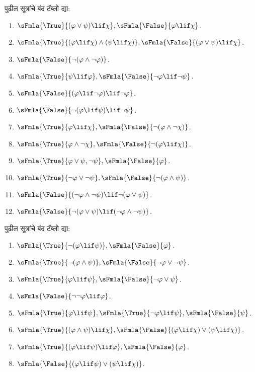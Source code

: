 \begin{prob}
पुढील सूत्रांचे बंद टॅब्लो द्या:
\begin{enumerate}
\item $\sFmla{\True}{(\varphi \lor \psi) \lif \chi}, \sFmla{\False}{\varphi \lif \chi}$.
\item $\sFmla{\True}{(\varphi \lif \chi) \land (\psi \lif \chi)}, \sFmla{\False}{(\varphi \lor \psi) \lif \chi}$.
\item $\sFmla{\False}{\lnot(\varphi \land \lnot \varphi)}$.
\item $\sFmla{\True}{\psi \lif \varphi}, \sFmla{\False}{\lnot \varphi \lif \lnot \psi}$.
\item $\sFmla{\False}{(\varphi \lif \lnot \varphi) \lif \lnot \varphi}$.
\item $\sFmla{\False}{\lnot(\varphi \lif \psi) \lif \lnot \psi}$.
\item $\sFmla{\True}{\varphi \lif \chi}, \sFmla{\False}{\lnot (\varphi \land \lnot \chi)}$.
\item $\sFmla{\True}{\varphi \land \lnot \chi}, \sFmla{\False}{\lnot (\varphi \lif \chi)}$.
\item $\sFmla{\True}{\varphi \lor \psi, \lnot \psi}, \sFmla{\False}{\varphi}$.
\item $\sFmla{\True}{\lnot \varphi \lor \lnot \psi}, \sFmla{\False}{\lnot(\varphi \land \psi)}$.
\item $\sFmla{\False}{(\lnot \varphi \land \lnot \psi) \lif\lnot(\varphi \lor \psi)}$.
\item $\sFmla{\False}{\lnot(\varphi \lor \psi) \lif (\lnot \varphi \land \lnot \psi)}$.
\end{enumerate}
\end{prob}

\begin{prob}
पुढील सूत्रांचे बंद टॅब्लो द्या:
\begin{enumerate}
\item $\sFmla{\True}{\lnot(\varphi \lif \psi)}, \sFmla{\False}{\varphi}$.
\item $\sFmla{\True}{\lnot(\varphi \land \psi)}, \sFmla{\False}{\lnot \varphi \lor \lnot \psi}$.
\item $\sFmla{\True}{\varphi \lif \psi}, \sFmla{\False}{\lnot \varphi \lor \psi}$.
\item $\sFmla{\False}{\lnot \lnot \varphi \lif \varphi}$.
\item $\sFmla{\True}{\varphi \lif \psi}, \sFmla{\True}{\lnot \varphi \lif \psi}, \sFmla{\False}{\psi}$.
\item $\sFmla{\True}{(\varphi \land \psi) \lif \chi}, \sFmla{\False}{(\varphi \lif \chi) \lor (\psi \lif \chi)}$.
\item $\sFmla{\True}{(\varphi \lif \psi) \lif \varphi}, \sFmla{\False}{\varphi}$.
\item $\sFmla{\False}{(\varphi \lif \psi) \lor (\psi \lif \chi)}$.
\end{enumerate}
\end{prob}












